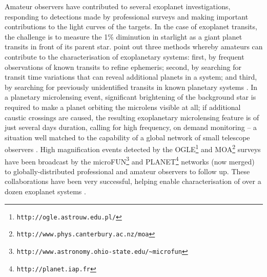\documentclass{ar2e}
\def\CaseStudy#1{\noindent{\it\bf #1 \,\,\,\,}}
\def\url#1{\texttt{#1}}
\begin{document}
\CaseStudy{Transiting and Microlensing Exoplanets.}  
Amateur observers have contributed to several exoplanet investigations,
responding to detections made by professional surveys and making important
contributions to the light curves of the targets. In the case of exoplanet
transits, the challenge is to measure the 1\% diminution in starlight as a giant
planet transits in front of its parent star. \citet{14mousis_proam} point out three
methods whereby amateurs can contribute to the characterisation of exoplanetary
systems: first, by frequent observations of known transits to refine ephemeris;
second, by searching for transit time variations that can reveal additional
planets in a system; and third, by searching for previously unidentified
transits in known planetary systems \citep[e.g., the discovery of the transit of
HD 80606b from a 30 cm telescope near London;][]{09fossey}. In a planetary
microlensing event, significant brightening of the background star is required
to make a planet orbiting the microlens visible at all; if additional caustic
crossings are caused, the resulting exoplanetary microlensing feature is of just
several days duration, calling for high frequency, on demand monitoring -- a
situation well matched to the capability of a global network of small telescope
observers \citep[see e.g.\ ][]{Christie2006}. High magnification events
detected by the  OGLE\footnote{\url{http://ogle.astrouw.edu.pl/}} and
MOA\footnote{\url{http://www.phys.canterbury.ac.nz/moa}} surveys have been
broadcast by the
microFUN\footnote{\url{http://www.astronomy.ohio-state.edu/\textasciitilde microfun}} and
PLANET\footnote{\url{http://planet.iap.fr}} networks (now merged) to
globally-distributed professional and amateur observers to follow up. These
collaborations have been very successful, helping enable characterisation of
over a dozen exoplanet systems \citep[see e.g.\ ][and references
therein]{Udalski++2005,Gould++2014}.


% 
% 
\end{document}
